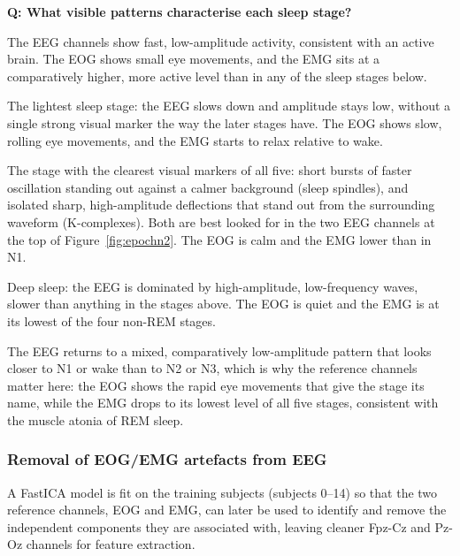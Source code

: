 \documentclass[11pt,a4paper]{article}
\begin{document}
\textbf{Q: What visible patterns characterise each sleep stage?}

\begin{description}[leftmargin=1.6em,style=nextline]

\item[Wake (subject 6, epoch 5).] The EEG channels show fast, low-amplitude activity, consistent
with an active brain. The EOG shows small eye movements, and the EMG sits at a comparatively
higher, more active level than in any of the sleep stages below.

\item[N1 (subject 6, epoch 64).] The lightest sleep stage: the EEG slows down and amplitude
stays low, without a single strong visual marker the way the later stages have. The EOG shows
slow, rolling eye movements, and the EMG starts to relax relative to wake.

\item[N2 (subject 6, epoch 74, Figure~\ref{fig:epochn2}).] The stage with the clearest visual
markers of all five: short bursts of faster oscillation standing out against a calmer
background (sleep spindles), and isolated sharp, high-amplitude deflections that stand out from
the surrounding waveform (K-complexes). Both are best looked for in the two EEG channels at the
top of Figure~\ref{fig:epochn2}. The EOG is
calm and the EMG lower than in N1.

\item[N3 (subject 6, epoch 173).] Deep sleep: the EEG is dominated by high-amplitude,
low-frequency waves, slower than anything in the stages above. The EOG is quiet and the EMG is
at its lowest of the four non-REM stages.

\item[REM (subject 6, epoch 255).] The EEG returns to a mixed, comparatively low-amplitude
pattern that looks closer to N1 or wake than to N2 or N3, which is why the reference channels
matter here: the EOG shows the rapid eye movements that give the stage its name, while the EMG
drops to its lowest level of all five stages, consistent with the muscle atonia of REM sleep.

\end{description}

\subsubsection{Removal of EOG/EMG artefacts from EEG}

A FastICA model is fit on the training subjects (subjects 0--14) so that the two reference
channels, EOG and EMG, can later be used to identify and remove the independent components they
are associated with, leaving cleaner Fpz-Cz and Pz-Oz channels for feature extraction.
\end{document}
